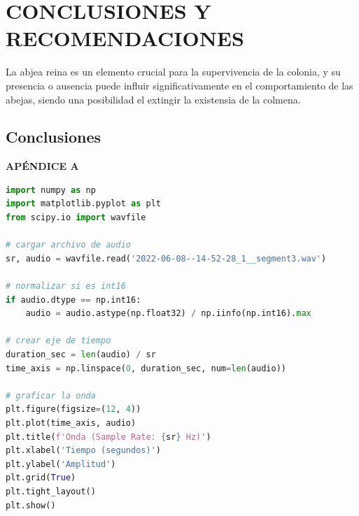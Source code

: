 \documentclass[12pt]{report}
\begin{document}
\pagebreak
\chapter{CONCLUSIONES Y RECOMENDACIONES}

\par La abjea reina es un elemento crucial para la supervivencia de la colonia, y su presencia o ausencia puede influir significativamente en el comportamiento de las abejas, siendo una posibilidad el extingir la existensia de la colmena. 


\section{Conclusiones}




\pagebreak
{}
\printbibliography
\thispagestyle{empty}


\pagebreak
{}
\begin{center}
\large\textbf{APÉNDICE A}
\end{center}

\begin{lstlisting}[language=Python, caption={Visualización de la forma de onda de un archivo de audio.}, label={lst:waveform}]
import numpy as np
import matplotlib.pyplot as plt
from scipy.io import wavfile

# cargar archivo de audio
sr, audio = wavfile.read('2022-06-08--14-52-28_1__segment3.wav')

# normalizar si es int16
if audio.dtype == np.int16:
    audio = audio.astype(np.float32) / np.iinfo(np.int16).max

# crear eje de tiempo
duration_sec = len(audio) / sr
time_axis = np.linspace(0, duration_sec, num=len(audio))

# graficar la onda
plt.figure(figsize=(12, 4))
plt.plot(time_axis, audio)
plt.title(f'Onda (Sample Rate: {sr} Hz)')
plt.xlabel('Tiempo (segundos)')
plt.ylabel('Amplitud')
plt.grid(True)
plt.tight_layout()
plt.show()
\end{lstlisting}
\end{document}

